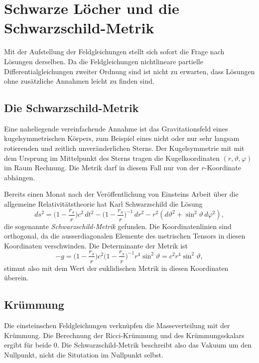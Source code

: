 %
%
\section{Schwarze Löcher und die Schwarzschild-Metrik
\label{buch:kruemmung:section:schwarzesloch}}
Mit der Aufstellung der Feldgleichungen stellt sich sofort die Frage
nach Lösungen derselben.
Da die Feldgleichungen nichtlineare partielle Differentialgleichungen
zweiter Ordnung sind ist nicht zu erwarten, dass Lösungen ohne
zusätzliche Annahmen leicht zu finden sind.

%
%
\subsection{Die Schwarzschild-Metrik}
Eine naheliegende vereinfachende Annahme ist das Gravitationsfeld
eines kugelsymmetrischen Körpers, zum Beispiel eines nicht oder nur
sehr langsam rotierenden und zeitlich unveränderlichen Sterns.
Der Kugelsymmetrie mit mit dem Ursprung im Mittelpunkt des Sterns
tragen die Kugelkoordinaten $(r,\vartheta,\varphi)$ im Raum Rechnung.
Die Metrik darf in diesem Fall nur von der $r$-Koordinate abhängen.

Bereits einen Monat nach der Veröffentlichung von Einsteins Arbeit
über die allgemeine Relativitätstheorie hat Karl Schwarzschild
%
die Lösung
\begin{equation}
ds^2
=
\biggl( 1-\frac{r_s}{r} \biggr)
c^2\,dt^2
-
\biggl(1-\frac{r_s}{r}\biggr)^{-1}
\,dr^2
-r^2 (d\vartheta^2 + \sin^2\vartheta\,d\varphi^2),
\label{buch:kruemmung:blackhole:eqn:schwarzschild}
\end{equation}
die sogenannte \emph{Schwarzschild-Metrik}
%
gefunden.
Die Koordinatenlinien sind orthogonal, da die ausserdiagonalen Elemente
des metrischen Tensors in diesen Koordinaten verschwinden.
Die Determinante der Metrik ist
\begin{equation}
-g
=
\biggl( 1-\frac{r_s}{r} \biggr)
c^2
\biggl(1-\frac{r_s}{r}\biggr)^{-1}
r^4 \sin^2\vartheta
=
c^2r^4\sin^2\vartheta,
\label{buch:kruemmung:schwarzesloch:eqn:g}
\end{equation}
stimmt also mit dem Wert der euklidischen Metrik in diesen Koordinaten
überein.

%
%
\subsection{Krümmung}
Die einsteinschen Feldgleichungen verknüpfen die Masseverteilung mit
der Krümmung.
Die Berechnung der Ricci-Krümmung und des Krümmungsskalars ergibt
für beide $0$.
Die Schwarzschild-Metrik beschreibt also das Vakuum um den Nullpunkt,
nicht die Situtation im Nullpunkt selbst.

